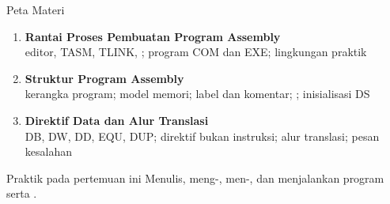 \documentclass[aspectratio=169,11pt]{beamer}
\begin{document}
\begin{frame}{Peta Materi}
\small
\begin{enumerate}
    \item \textbf{Rantai Proses Pembuatan Program Assembly}\\
          {\footnotesize editor, TASM, TLINK, ; program
          COM dan EXE; lingkungan praktik}

    \vspace{0.25em}
    \item \textbf{Struktur Program Assembly}\\
          {\footnotesize kerangka program; model memori; label dan
          komentar; ; inisialisasi DS}

    \vspace{0.25em}
    \item \textbf{Direktif Data dan Alur Translasi}\\
          {\footnotesize DB, DW, DD, EQU, DUP; direktif bukan
          instruksi; alur translasi; pesan kesalahan}
\end{enumerate}

\vspace{0.35em}
\begin{block}{Praktik pada pertemuan ini}
\small Menulis, meng-, men-, dan menjalankan
program  serta .
\end{block}
\end{frame}

\end{document}
